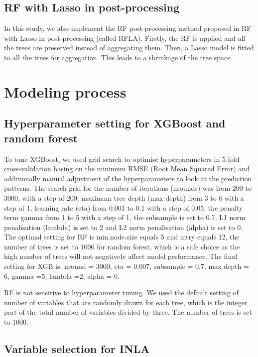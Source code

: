 \documentclass{article}
\begin{document}
\subsection{RF with Lasso in post-processing}

In this study, we also implement the RF post-processing method proposed in \cite{hastie2009elements} RF with Lasso in post-processing (called RFLA). Firstly, the RF is applied and all the trees are preserved instead of aggregating them. Then, a Lasso model is fitted to all the trees for aggregation. This leads to a shrinkage of the tree space. 

\section{Modeling process}

\subsection{Hyperparameter setting for XGBoost and random forest}
\label{sec:hp}

To tune XGBoost, we used grid search to optimise hyperparameters in 5-fold cross-validation basing on the minimum RMSE (Root Mean Squared Error) and additionally manual adjustment of the hyperparameters to look at the prediction patterns. The search grid for the number of iterations (nrounds) was from 200 to 3000, with a step of 200; maximum tree depth (max-depth) from 3 to 6 with a step of 1, learning rate (eta) from 0.001 to 0.1 with a step of 0.05, the penalty term gamma \citep{xgboost}  from 1 to 5 with a step of 1, the subsample is set to 0.7, L1 norm penalisation (lambda) is set to 2 and L2 norm penalisation (alpha) is set to 0.  The optimal setting for RF is min.node.size equals 5 and mtry equals 12, the number of trees is set to 1000 for random forest, which is a safe choice as the high number of trees will not negatively affect model performance. The final setting for XGB is: nround = 3000, eta = 0.007, subsample = 0.7, max-depth = 6, gamma =5, lambda =2, alpha = 0. 

RF is not sensitive to hyperparameter tuning. We used the default setting of number of variables that are randomly drawn for each tree\citep{breiman2001random}, which is the integer part of the total number of variables divided by three. The number of trees is set to 1000. 


\subsection{Variable selection for INLA} 
\end{document}
